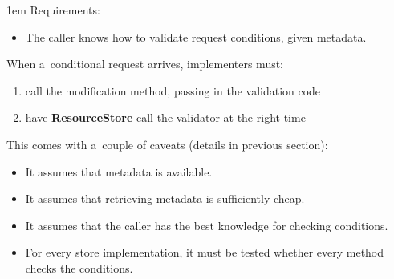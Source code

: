\documentclass[10pt]{article}
\newenvironment{Note}
  {\begin{multicols}{3}%
     \parskip 1em}
  {\end{multicols}}
\begin{document}
\begin{Note}
Requirements:
\begin{itemize}
  \item The caller knows how to validate request conditions,
        given metadata.
\end{itemize}

\bigskip
When a~conditional request arrives, implementers must:
\begin{enumerate}
  \item call the modification method,
        passing in the validation code
  \item have \textbf{ResourceStore} call the validator
        at the right time
\end{enumerate}

\bigskip
This comes with a~couple of caveats
(details in previous section):
\begin{itemize}
  \item It assumes that metadata is available.
  \item It assumes that retrieving metadata is sufficiently cheap.
  \item It assumes that the caller has the best knowledge for checking conditions.
  \item For every store implementation,
        it must be tested whether every method checks the conditions.
\end{itemize}

\columnbreak
\null


\columnbreak
\null

\end{Note}


\clearpage
\end{document}

